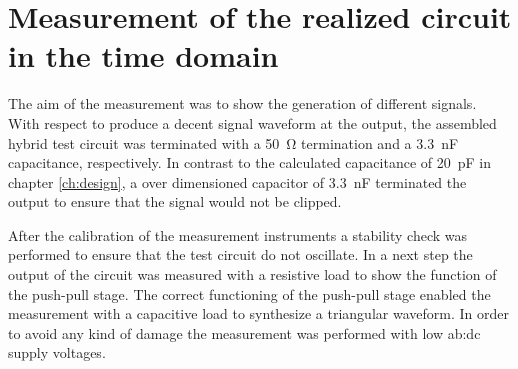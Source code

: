 \chapter{Measurement of the realized circuit in the time domain}
\label{ch:measurement}


The aim of the measurement was to show the generation of different signals.\\
With respect to produce a decent signal waveform at the output, the assembled hybrid test circuit was terminated with a \SI{50}{\ohm} termination and a \SI{3.3}{\nano\farad} capacitance, respectively.
In contrast to the calculated capacitance of \SI{20}{\pico \farad} in chapter \ref{ch:design}, a over dimensioned capacitor of \SI{3.3}{\nano\farad} terminated the output to ensure that the signal would not be clipped.

After the calibration of the measurement instruments a stability check was performed to ensure that the test circuit do not oscillate.
In a next step the output of the circuit was measured with a resistive load to show the function of the push-pull stage.
The correct functioning of the push-pull stage enabled the measurement with a capacitive load to synthesize a triangular waveform.
In order to avoid any kind of damage the measurement was performed with low \gls{ab:dc} supply voltages.


